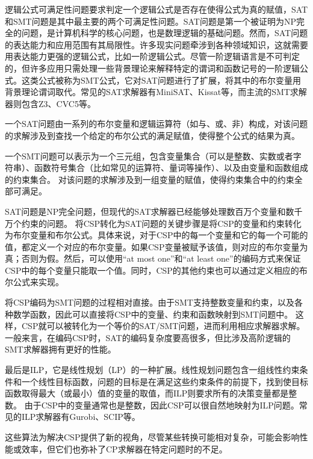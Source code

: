 逻辑公式可满足性问题要求判定一个逻辑公式是否存在使得公式为真的赋值，SAT和SMT问题是其中最主要的两个可满足性问题。SAT问题是第一个被证明为NP完全的问题，是计算机科学的核心问题，也是数理逻辑的基础问题。然而，SAT问题的表达能力和应用范围有其局限性。许多现实问题牵涉到各种领域知识，这就需要用表达能力更强的逻辑公式，比如一阶逻辑公式。尽管一阶逻辑语言是不可判定的，但许多应用只需处理一些背景理论来解释特定的谓词和函数记号的一阶逻辑公式。这类公式被称为SMT公式，它对SAT问题进行了扩展，将其中的布尔变量用背景理论谓词取代。常见的SAT求解器有MiniSAT、Kissat等，而主流的SMT求解器则包含Z3、CVC5等。

\begin{definition}
    一个SAT问题由一系列的布尔变量和逻辑运算符（如与、或、非）构成，对该问题的求解涉及到查找一个给定的布尔公式的满足赋值，使得整个公式的结果为真。
\end{definition}

\begin{definition}
    一个SMT问题可以表示为一个三元组，包含变量集合（可以是整数、实数或者字符串）、函数符号集合（比如常见的运算符、量词等操作）、以及由变量和函数组成的约束集合。
    对该问题的求解涉及到一组变量的赋值，使得约束集合中的约束全部可满足。
\end{definition}

SAT问题是NP完全问题，但现代的SAT求解器已经能够处理数百万个变量和数千万个约束的问题。
将CSP转化为SAT问题的关键步骤是将CSP的变量和约束转化为布尔变量和布尔公式。具体来说，对于CSP中的每一个变量和它的每一个可能的值，都定义一个对应的布尔变量。如果CSP变量被赋予该值，则对应的布尔变量为真；否则为假。然后，可以使用“at most one”和“at least one”的编码方式来保证CSP中的每个变量只能取一个值。同时，CSP的其他约束也可以通过定义相应的布尔公式来实现。

将CSP编码为SMT问题的过程相对直接。由于SMT支持整数变量和约束，以及各种数学函数，因此可以直接将CSP中的变量、约束和函数映射到SMT问题中。
这样，CSP就可以被转化为一个等价的SAT/SMT问题，进而利用相应求解器求解。一般来言，在编码CSP时，SAT的编码复杂度要高很多，但比涉及高阶逻辑的SMT求解器拥有更好的性能。

最后是ILP，它是线性规划（LP）的一种扩展。线性规划问题包含一组线性约束条件和一个线性目标函数，问题的目标是在满足这些约束条件的前提下，找到使目标函数取得最大（或最小）值的变量的取值，而ILP则要求所有的决策变量都是整数。
由于CSP中的变量通常也是整数，因此CSP可以很自然地映射为ILP问题。常见的ILP求解器有Gurobi、SCIP等。

这些算法为解决CSP提供了新的视角，尽管某些转换可能相对复杂，可能会影响性能或效率，但它们也弥补了CP求解器在特定问题时的不足。

